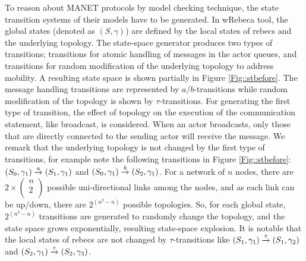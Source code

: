 To reason about MANET protocols by  model checking technique, the state transition systems of their models have to be generated. In wRebeca tool, the global states (denoted as $(S,\gamma)$) are defined by the local states of rebecs and the underlying topology.
%
The state-space generator produces two types of transitions; transitions for atomic handling of messages in the actor queues, and transitions for random modification of the underlying topology to address mobility. A resulting state space %
is shown partially in Figure \ref{Fig::stbefore}. The message handling transitions are represented by $a/b$-transitions while random modification of the topology is shown by $\tau$-transitions. %
For generating the first type of transition, the effect of topology on the execution of the communication statement, like broadcast, is considered.
When an actor broadcasts, only those that are directly connected to the sending actor will receive the message. We remark that the underlying topology is not changed by the first type of transitions, for example note the following transitions in Figure \ref{Fig::stbefore}:  $(S_0,\gamma_1)\overto{a}(S_1,\gamma_1)$  and $(S_0,\gamma_1)\overto{b}(S_2,\gamma_1)$. For a network of $n$ nodes, there are $2\times \begin{pmatrix}
n \\
2 \\
\end{pmatrix}$ possible uni-directional links among the nodes, and as each link can be up/down, there are $2^{(n^2-n)}$ possible topologies. So, for each global state, $2^{(n^2-n)}$ transitions are generated to randomly change the topology, and the state space grows exponentially, resulting state-space explosion. It is notable that the local states of rebecs are not changed by $\tau$-transitions like $(S_1,\gamma_1)\overto{\tau}(S_1,\gamma_2)$ and $(S_2,\gamma_1)\overto{\tau}(S_2,\gamma_3)$.

